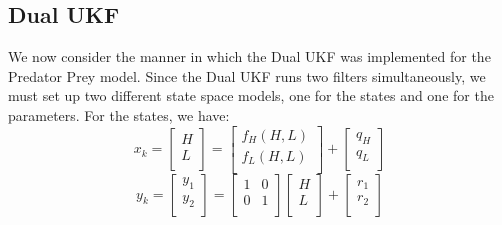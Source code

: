 \documentclass{article}
\begin{document}
\subsection{Dual UKF} \label{section:DualUKF}
We now consider the manner in which the Dual UKF was implemented for the Predator Prey model. Since the Dual UKF runs two filters simultaneously, we must set up two different state space models, one for the states and one for the parameters. For the states, we have:
\begin{equation}
x_k = \begin{bmatrix}
H\\
L\\
\end{bmatrix} = \begin{bmatrix}
f_H(H,L)\\
f_L(H,L)\\
\end{bmatrix} + \begin{bmatrix}
q_H\\
q_L\\
\end{bmatrix}
\end{equation}
\begin{equation}
y_k = \begin{bmatrix}
y_1\\
y_2\\
\end{bmatrix} = 
\begin{bmatrix}
1 & 0\\
0 & 1\\
\end{bmatrix}
\begin{bmatrix}
H\\
L\\
\end{bmatrix}+
\begin{bmatrix}
r_1\\
r_2\\
\end{bmatrix}
\end{equation}
\end{document}
